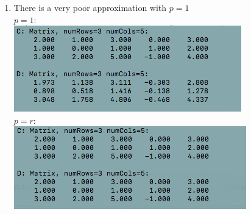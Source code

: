 \documentclass{article}
\begin{document}
\begin{enumerate}
\item There is a very poor approximation with $p=1$\\
$p=1: $\\
\includegraphics[scale=0.6]{exercise9_p-1}\\
$p=r: $\\
\includegraphics[scale=0.6]{exercise9_p-r}


\end{enumerate}
\end{document}

